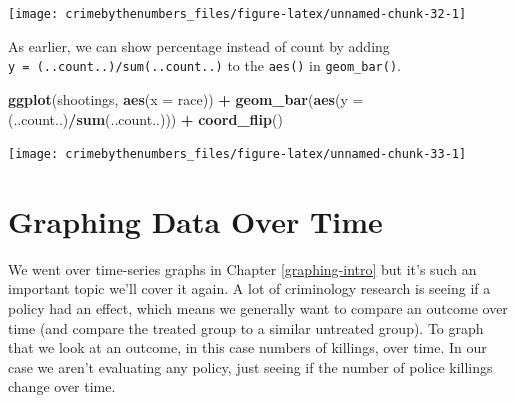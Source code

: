 \documentclass[
  12pt,
]{book}
\newenvironment{Shaded}{\begin{snugshade}}{\end{snugshade}}
\newcommand{\DataTypeTok}[1]{\textcolor[rgb]{0.27,0.27,0.27}{#1}}
\newcommand{\KeywordTok}[1]{\textcolor[rgb]{0.27,0.27,0.27}{\textbf{#1}}}
\newcommand{\NormalTok}[1]{#1}
\newcommand{\OperatorTok}[1]{\textcolor[rgb]{0.43,0.43,0.43}{\textbf{#1}}}
\newcommand{\OtherTok}[1]{\textcolor[rgb]{0.37,0.37,0.37}{#1}}
\newcommand{\StringTok}[1]{\textcolor[rgb]{0.5,0.5,0.5}{#1}}
\begin{document}
\begin{Shaded}
\end{Shaded}

\begin{center}\texttt{[image: crimebythenumbers\_files/figure-latex/unnamed-chunk-32-1]} \end{center}

As earlier, we can show percentage instead of count by adding \texttt{y\ =\ (..count..)/sum(..count..)} to the \texttt{aes()} in \texttt{geom\_bar()}.

\begin{Shaded}
\begin{Highlighting}[]
\KeywordTok{ggplot}\NormalTok{(shootings, }\KeywordTok{aes}\NormalTok{(}\DataTypeTok{x =}\NormalTok{ race)) }\OperatorTok{+}\StringTok{ }
\StringTok{  }\KeywordTok{geom\_bar}\NormalTok{(}\KeywordTok{aes}\NormalTok{(}\DataTypeTok{y =}\NormalTok{ (..count..)}\OperatorTok{/}\KeywordTok{sum}\NormalTok{(..count..))) }\OperatorTok{+}
\StringTok{  }\KeywordTok{coord\_flip}\NormalTok{() }
\end{Highlighting}
\end{Shaded}

\begin{center}\texttt{[image: crimebythenumbers\_files/figure-latex/unnamed-chunk-33-1]} \end{center}

\hypertarget{graphing-data-over-time}{%
\section{Graphing Data Over Time}\label{graphing-data-over-time}}

We went over time-series graphs in Chapter \ref{graphing-intro} but it's such an important topic we'll cover it again. A lot of criminology research is seeing if a policy had an effect, which means we generally want to compare an outcome over time (and compare the treated group to a similar untreated group). To graph that we look at an outcome, in this case numbers of killings, over time. In our case we aren't evaluating any policy, just seeing if the number of police killings change over time.
\end{document}
